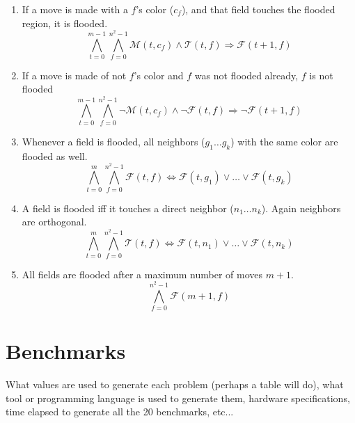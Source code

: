 \documentclass[conference]{IEEEtran}
\newcommand{\nMoves}{\ensuremath{m}\xspace}
\newcommand{\bSize}{\ensuremath{n}\xspace}
\newcommand{\clr}{\ensuremath{c}\xspace}
\newcommand{\flood}[2]{\ensuremath{\mathcal{F}(#1,#2)}\xspace}
\newcommand{\move}[2]{\ensuremath{\mathcal{M}(#1,#2)}\xspace}
\newcommand{\touch}[2]{\ensuremath{\mathcal{T}(#1,#2)}\xspace}
\newcommand{\turn}{\ensuremath{t}\xspace}
\newcommand{\field}{\ensuremath{f}\xspace}
\begin{document}
\begin{enumerate}
	\item If a move is made with a \field's color ($\clr_\field$), and that field touches the flooded region, it is flooded.
	\begin{equation}
	\bigwedge_{\turn=0}^{\nMoves-1}
	\bigwedge_{\field=0}^{{\bSize^2}-1}
	\move{\turn}{\clr_\field}\wedge\touch{\turn}{\field}\Rightarrow\flood{\turn+1}{\field}
	\end{equation}
	\item If a move is made of not  \field's color and \field was not flooded already, \field is not flooded
	\begin{equation}
	\bigwedge_{\turn=0}^{\nMoves-1}
	\bigwedge_{\field=0}^{{\bSize^2}-1}
	\neg\move{\turn}{\clr_\field}\wedge\neg\flood{\turn}{\field}\Rightarrow\neg\flood{\turn+1}{\field}
	\end{equation}
	\item Whenever a field is flooded, all neighbors ($g_1\dots g_k$) with the same color are flooded as well.
	\begin{equation}
	\bigwedge_{\turn=0}^{\nMoves}
	\bigwedge_{\field=0}^{{\bSize^2}-1}
	\flood{\turn}{\field}\Leftrightarrow\flood{\turn}{g_1}\vee\dots\vee\flood{\turn}{g_k}
	\end{equation} 
	\item A field is flooded iff it touches a direct neighbor ($\bSize_1\dots \bSize_k$). Again neighbors are orthogonal.
	\begin{equation}
	\bigwedge_{\turn=0}^{\nMoves}
	\bigwedge_{\field=0}^{{\bSize^2}-1}
	\touch{\turn}{\field}\Leftrightarrow\flood{\turn}{n_1}\vee\dots\vee\flood{\turn}{n_k}
	\end{equation} 
	\item All fields are flooded after a maximum number of moves $\nMoves+1$.
	\begin{equation}
	\bigwedge_{\field=0}^{{\bSize^2}-1}
	\flood{\nMoves+1}{\field}
	\end{equation} 
\end{enumerate}
\section{Benchmarks}
What values are used to generate each problem (perhaps a table will do), what tool or programming language is used to generate them, hardware specifications, time elapsed to generate all the 20 benchmarks, etc...


\end{document}
